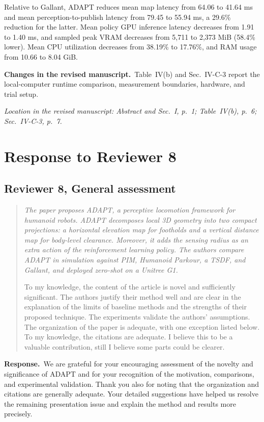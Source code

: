 \documentclass[11pt]{article}
\newenvironment{reviewcomment}{\begin{quote}\color{reviewblue}\itshape}{\end{quote}}
\newcommand{\Response}{\par\noindent\textbf{Response.}\ }
\newcommand{\Changes}{\par\noindent\textbf{Changes in the revised manuscript.}\ }
\newcommand{\Location}[1]{\par\noindent\textit{Location in the revised manuscript: #1}}
\begin{document}
Relative to Gallant, ADAPT reduces mean map latency from 64.06 to 41.64 ms and mean perception-to-publish latency from 79.45 to 55.94 ms, a 29.6\% reduction for the latter. Mean policy GPU inference latency decreases from 1.91 to 1.40 ms, and sampled peak VRAM decreases from 5,711 to 2,373 MiB (58.4\% lower). Mean CPU utilization decreases from 38.19\% to 17.76\%, and RAM usage from 10.66 to 8.04 GiB.
\Changes Table~IV(b) and Sec.~IV-C-3 report the local-computer runtime comparison, measurement boundaries, hardware, and trial setup.


\Location{Abstract and Sec.~I, p.~1; Table~IV(b), p.~6; Sec.~IV-C-3, p.~7.}

\clearpage
\section*{Response to Reviewer 8}
\subsection*{Reviewer 8, General assessment}
\begin{reviewcomment}
The paper proposes ADAPT, a perceptive locomotion framework for humanoid robots. ADAPT decomposes local 3D geometry into two compact projections: a horizontal elevation map for footholds and a vertical distance map for body-level clearance. Moreover, it adds the sensing radius as an extra action of the reinforcement learning policy. The authors compare ADAPT in simulation against PIM, Humanoid Parkour, a TSDF, and Gallant, and deployed zero-shot on a Unitree G1.

To my knowledge, the content of the article is novel and sufficiently significant. The authors justify their method well and are clear in the explanation of the limits of baseline methods and the strengths of their proposed technique. The experiments validate the authors' assumptions. The organization of the paper is adequate, with one exception listed below. To my knowledge, the citations are adequate. I believe this to be a valuable contribution, still I believe some parts could be clearer.
\end{reviewcomment}
\Response We are grateful for your encouraging assessment of the novelty and significance of ADAPT and for your recognition of the motivation, comparisons, and experimental validation. Thank you also for noting that the organization and citations are generally adequate. Your detailed suggestions have helped us resolve the remaining presentation issue and explain the method and results more precisely.
\end{document}
